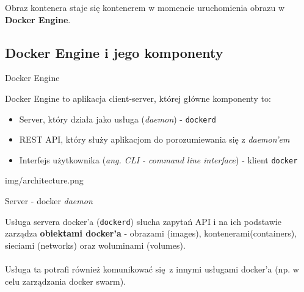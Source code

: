 \documentclass[aspectratio=169]{beamer}
\begin{document}
\begin{frame}
    \begin{multicols}{2}
        \vspace*{47mm}
        \begin{card}
            Obraz kontenera staje się kontenerem w momencie uruchomienia obrazu w \textbf{Docker Engine}.
        \end{card}
    \end{multicols}
\end{frame}

\subsection{Docker Engine i jego komponenty}
\begin{frame}{Docker Engine}

    \begin{card}
        Docker Engine to aplikacja client-server, której główne komponenty to:
        \begin{itemize}
            \item Server, który działa jako usługa (\textit{daemon}) - \colorbox{dark-gray}{\lstinline{dockerd}}
            \item REST API, który służy aplikacjom do porozumiewania się z \textit{daemon'em}
            \item Interfejs użytkownika (\textit{ang. CLI - command line interface}) - klient \colorbox{dark-gray}{\lstinline{docker}}
        \end{itemize}
    \end{card}
\end{frame}

\begin{frameImg}[50mm]{img/architecture.png}
\end{frameImg}


\begin{frame}{Server - docker \textit{daemon}}
    \begin{card}
        Usługa servera docker'a (\colorbox{dark-gray}{\lstinline{dockerd}}) słucha zapytań API i na ich podstawie zarządza \textbf{obiektami docker'a} - obrazami (images), kontenerami(containers), sieciami (networks) oraz woluminami (volumes).\\\\
        Usługa ta potrafi również komunikować się z innymi usługami docker'a (np. w celu zarządzania docker swarm).
    \end{card}
\end{frame}
\end{document}
